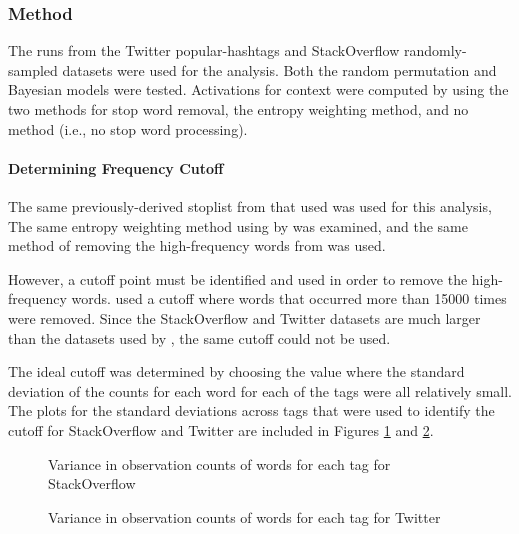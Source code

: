 \documentclass[man,floatsintext,donotrepeattitle]{apa6}
\begin{document}
\subsubsection{Method}

The runs from the Twitter popular-hashtags and StackOverflow randomly-sampled datasets were used for the analysis.
Both the random permutation and Bayesian models were tested.
Activations for context were computed by using the two methods for stop word removal, the entropy weighting method, and no method (i.e., no stop word processing).

\paragraph{Determining Frequency Cutoff}

The same previously-derived stoplist from \textcite{Salton2014} that \textcite{Sahlgren2008} used was used for this analysis,
The same entropy weighting method using by \textcite{Stanley2013} was examined,
and the same method of removing the high-frequency words from \citeauthor{Sahlgren2008} was used.

However, a cutoff point must be identified and used in order to remove the high-frequency words.
\textcite{Sahlgren2008} used a cutoff where words that occurred more than \num{15000} times were removed.
Since the StackOverflow and Twitter datasets are much larger than the datasets used by \citeauthor{Sahlgren2008}, the same cutoff could not be used.

The ideal cutoff was determined by choosing the value where the standard deviation of the counts for each word for each of the tags were all relatively small.
The plots for the standard deviations across tags that were used to identify the cutoff for StackOverflow and Twitter are included in Figures \ref{figContextCutoffSO} and \ref{figContextCutoffT}.

\begin{figure}[!htbp]
  \caption{Variance in observation counts of words for each tag for StackOverflow}
  \label{figContextCutoffSO}
\end{figure}

\begin{figure}[!htbp]
  \caption{Variance in observation counts of words for each tag for Twitter}
  \label{figContextCutoffT}
\end{figure}
\end{document}
